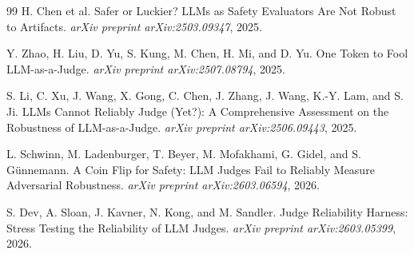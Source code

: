 \documentclass[11pt]{article}
\begin{document}
\begin{thebibliography}{99}
H. Chen et al.
\newblock Safer or Luckier? LLMs as Safety Evaluators Are Not Robust to Artifacts.
\newblock \emph{arXiv preprint arXiv:2503.09347}, 2025.

Y. Zhao, H. Liu, D. Yu, S. Kung, M. Chen, H. Mi, and D. Yu.
\newblock One Token to Fool LLM-as-a-Judge.
\newblock \emph{arXiv preprint arXiv:2507.08794}, 2025.

S. Li, C. Xu, J. Wang, X. Gong, C. Chen, J. Zhang, J. Wang, K.-Y. Lam, and S. Ji.
\newblock LLMs Cannot Reliably Judge (Yet?): A Comprehensive Assessment on the Robustness of LLM-as-a-Judge.
\newblock \emph{arXiv preprint arXiv:2506.09443}, 2025.

L. Schwinn, M. Ladenburger, T. Beyer, M. Mofakhami, G. Gidel, and S. G{\"u}nnemann.
\newblock A Coin Flip for Safety: LLM Judges Fail to Reliably Measure Adversarial Robustness.
\newblock \emph{arXiv preprint arXiv:2603.06594}, 2026.

S. Dev, A. Sloan, J. Kavner, N. Kong, and M. Sandler.
\newblock Judge Reliability Harness: Stress Testing the Reliability of LLM Judges.
\newblock \emph{arXiv preprint arXiv:2603.05399}, 2026.

\end{thebibliography}
\end{document}
